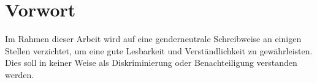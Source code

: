 \clearpage

\chapter*{Vorwort}

Im Rahmen dieser Arbeit wird auf eine genderneutrale Schreibweise an einigen Stellen verzichtet, um eine gute Lesbarkeit und Verständlichkeit zu gewährleisten. Dies soll in keiner Weise als Diskriminierung oder Benachteiligung verstanden werden.

\newpage